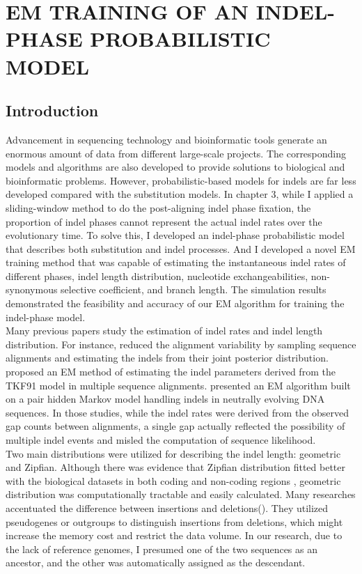 \chapter{\normalfont EM TRAINING OF AN INDEL-PHASE PROBABILISTIC MODEL}
\label{ch:indel_phase_model}


\section{Introduction}
Advancement in sequencing technology and bioinformatic tools generate an enormous amount of data from different large-scale projects. The corresponding models and algorithms are also developed to provide solutions to biological and bioinformatic problems. However, probabilistic-based models for indels are far less developed compared with the substitution models. In chapter 3, while I applied a sliding-window method to do the post-aligning indel phase fixation, the proportion of indel phases cannot represent the actual indel rates over the evolutionary time. To solve this, I developed an indel-phase probabilistic model that describes both substitution and indel processes. And I developed a novel EM training method that was capable of estimating the instantaneous indel rates of different phases,  indel length distribution, nucleotide exchangeabilities, non-synonymous selective coefficient, and branch length. The simulation results demonstrated the feasibility and accuracy of our EM algorithm for training the indel-phase model.\\
\indent Many previous papers study the estimation of indel rates and indel length distribution. For instance, \citeauthor{metzler2001assessing} reduced the alignment variability by sampling sequence alignments and estimating the indels from their joint posterior distribution. \citeauthor{holmes2005using} proposed an EM method of estimating the indel parameters derived from the TKF91 model in multiple sequence alignments. \citeauthor{cartwright2009problems} presented an EM algorithm built on a pair hidden Markov model handling indels in neutrally evolving DNA sequences. In those studies, while the indel rates were derived from the observed gap counts between alignments, a single gap actually reflected the possibility of multiple indel events and misled the computation of sequence likelihood. \\
\indent Two main distributions were utilized for describing the indel length: geometric and Zipfian. Although there was evidence that Zipfian distribution fitted better with the biological datasets in both coding \parencite{benner1993empirical} and non-coding regions \parencite{saitou1994evolutionary}, geometric distribution was computationally tractable and easily calculated. Many researches accentuated the difference between insertions and deletions(\cite{tao2007patterns,metzgar2002domain}). They utilized pseudogenes or outgroups to distinguish insertions from deletions, which might increase the memory cost and restrict the data volume. In our research, due to the lack of reference genomes, I presumed one of the two sequences as an ancestor, and the other was automatically assigned as the descendant.\\
